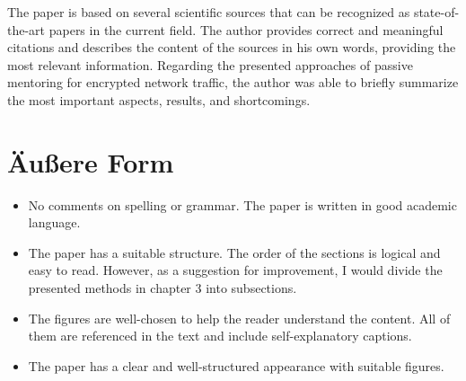 \documentclass[a4paper,DIV=16]{scrartcl}
\begin{document}
The paper is based on several scientific sources that can be recognized as state-of-the-art papers in the current field. The author provides correct and meaningful citations and describes the content of the sources in his own words, providing the most relevant information. Regarding the presented approaches of passive mentoring for encrypted network traffic, the author was able to briefly summarize the most important aspects, results, and shortcomings.

\section*{Äußere Form}
  
\begin{itemize}
\item No comments on spelling or grammar. The paper is written in good academic language.
\item The paper has a suitable structure. The order of the sections is logical and easy to read. However, as a suggestion for improvement, I would divide the presented methods in chapter 3 into subsections.
\item The figures are well-chosen to help the reader understand the content. All of them are referenced in the text and include self-explanatory captions.
\item The paper has a clear and well-structured appearance with suitable figures.
\end{itemize}  
\end{document}
